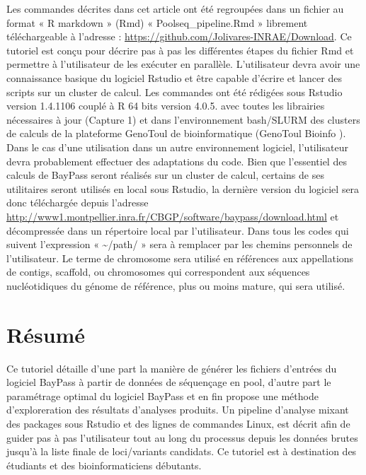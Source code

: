 \documentclass[
  openany]{book}
\begin{document}
Les commandes décrites dans cet article ont été regroupées dans un fichier au format « R markdown » (Rmd) « Poolseq\_pipeline.Rmd » librement téléchargeable à l'adresse : \url{https://github.com/Jolivares-INRAE/Download}. Ce tutoriel est conçu pour décrire pas à pas les différentes étapes du fichier Rmd et permettre à l'utilisateur de les exécuter en parallèle.
L'utilisateur devra avoir une connaissance basique du logiciel Rstudio et être capable d'écrire et lancer des scripts sur un cluster de calcul.
Les commandes ont été rédigées sous Rstudio version 1.4.1106 couplé à R 64 bits version 4.0.5. avec toutes les librairies nécessaires à jour (Capture 1) et dans l'environnement bash/SLURM des clusters de calculs de la plateforme GenoToul de bioinformatique (GenoToul Bioinfo ). Dans le cas d'une utilisation dans un autre environnement logiciel, l'utilisateur devra probablement effectuer des adaptations du code.
Bien que l'essentiel des calculs de BayPass seront réalisés sur un cluster de calcul, certains de ses utilitaires seront utilisés en local sous Rstudio, la dernière version du logiciel sera donc téléchargée depuis l'adresse \url{http://www1.montpellier.inra.fr/CBGP/software/baypass/download.html} et décompressée dans un répertoire local par l'utilisateur.
Dans tous les codes qui suivent l'expression « \textasciitilde/path/ » sera à remplacer par les chemins personnels de l'utilisateur.
Le terme de chromosome sera utilisé en références aux appellations de contigs, scaffold, ou chromosomes qui correspondent aux séquences nucléotidiques du génome de référence, plus ou moins mature, qui sera utilisé.

\hypertarget{ruxe9sumuxe9-1}{%
\chapter*{Résumé}\label{ruxe9sumuxe9-1}}

Ce tutoriel détaille d'une part la manière de générer les fichiers d'entrées du logiciel BayPass à partir de données de séquençage en pool, d'autre part le paramétrage optimal du logiciel BayPass et en fin propose une méthode d'exploreration des résultats d'analyses produits. Un pipeline d'analyse mixant des packages sous Rstudio et des lignes de commandes Linux, est décrit afin de guider pas à pas l'utilisateur tout au long du processus depuis les données brutes jusqu'à la liste finale de loci/variants candidats.
Ce tutoriel est à destination des étudiants et des bioinformaticiens débutants.
\end{document}
